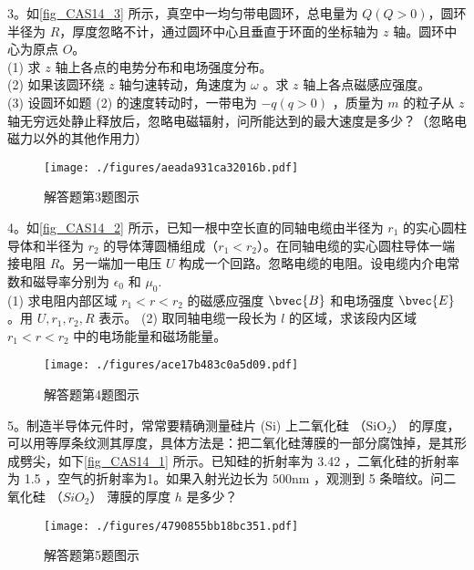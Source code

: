 3。如\autoref{fig_CAS14_3} 所示，真空中一均匀带电圆环，总电量为 $Q(Q>0)$，圆环半径为 $R$，厚度忽略不计，通过圆环中心且垂直于环面的坐标轴为 $z$ 轴。圆环中心为原点 $O$。\\
(1) 求 $z$ 轴上各点的电势分布和电场强度分布。\\
(2) 如果该圆环绕 $z$ 轴匀速转动，角速度为 $\omega$ 。求 $z$ 轴上各点磁感应强度。\\
(3) 设圆环如题 (2) 的速度转动时，一带电为 $-q(q>0)$ ，质量为 $m$ 的粒子从 $z$ 轴无穷远处静止释放后，忽略电磁辐射，问所能达到的最大速度是多少？（忽略电磁力以外的其他作用力）
\begin{figure}[ht]
\centering
\texttt{[image: ./figures/aeada931ca32016b.pdf]}
\caption{解答题第3题图示} \label{fig_CAS14_3}
\end{figure}

4。如\autoref{fig_CAS14_2} 所示，已知一根中空长直的同轴电缆由半径为 $r_1$ 的实心圆柱导体和半径为 $r_2$ 的导体薄圆桶组成（$r_1<r_2$）。在同轴电缆的实心圆柱导体一端接电阻 $R$。另一端加一电压 $U$ 构成一个回路。忽略电缆的电阻。设电缆内介电常数和磁导率分别为 $\epsilon_0$ 和 $\mu_0$.\\
(1) 求电阻内部区域 $r_1<r<r_2$ 的磁感应强度 $\bvec{B}$ 和电场强度 $\bvec{E}$。用 $U,r_1,r_2,R$ 表示。
(2) 取同轴电缆一段长为 $l$ 的区域，求该段内区域 $r_1<r<r_2$ 中的电场能量和磁场能量。
\begin{figure}[ht]
\centering
\texttt{[image: ./figures/ace17b483c0a5d09.pdf]}
\caption{解答题第4题图示} \label{fig_CAS14_2}
\end{figure}

5。制造半导体元件时，常常要精确测量硅片 (Si) 上二氧化硅 （$\mathrm{SiO_2}$） 的厚度，可以用等厚条纹测其厚度，具体方法是：把二氧化硅薄膜的一部分腐蚀掉，是其形成劈尖，如下\autoref{fig_CAS14_1} 所示。已知硅的折射率为 3.42 ，二氧化硅的折射率为 1.5 ，空气的折射率为1。如果入射光边长为 $500\mathrm{nm}$ ，观测到 5 条暗纹。问二氧化硅 （$SiO_2$） 薄膜的厚度 $h$ 是多少？
\begin{figure}[ht]
\centering
\texttt{[image: ./figures/4790855bb18bc351.pdf]}
\caption{解答题第5题图示} \label{fig_CAS14_1}
\end{figure}